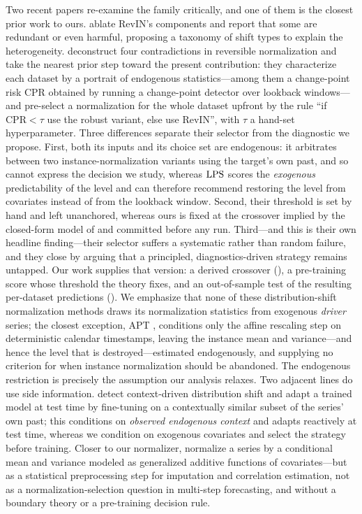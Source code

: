 Two recent papers re-examine the family critically, and one of them is the closest prior work to ours. \citet{role2026revin} ablate RevIN's components and report that some are redundant or even harmful, proposing a taxonomy of shift types to explain the heterogeneity. \citet{noise2025signal} deconstruct four contradictions in reversible normalization and take the nearest prior step toward the present contribution: they characterize each dataset by a portrait of endogenous statistics---among them a change-point risk $\mathrm{CPR}$ obtained by running a change-point detector over lookback windows---and pre-select a normalization for the whole dataset upfront by the rule ``if $\mathrm{CPR} < \tau$ use the robust variant, else use RevIN'', with $\tau$ a hand-set hyperparameter. Three differences separate their selector from the diagnostic we propose. First, both its inputs and its choice set are endogenous: it arbitrates between two instance-normalization variants using the target's own past, and so cannot express the decision we study, whereas $\mathrm{LPS}$ scores the \emph{exogenous} predictability of the level and can therefore recommend restoring the level from covariates instead of from the lookback window. Second, their threshold is set by hand and left unanchored, whereas ours is fixed at the crossover implied by the closed-form model of  and committed before any run. Third---and this is their own headline finding---their selector suffers a systematic rather than random failure, and they close by arguing that a principled, diagnostics-driven strategy remains untapped. Our work supplies that version: a derived crossover (), a pre-training score whose threshold the theory fixes, and an out-of-sample test of the resulting per-dataset predictions (). We emphasize that none of these distribution-shift normalization methods draws its normalization statistics from exogenous \emph{driver} series; the closest exception, APT \citep{li2026apt}, conditions only the affine rescaling step on deterministic calendar timestamps, leaving the instance mean and variance---and hence the level that is destroyed---estimated endogenously, and supplying no criterion for when instance normalization should be abandoned. The endogenous restriction is precisely the assumption our analysis relaxes. Two adjacent lines do use side information. \citet{chen2024solid} detect context-driven distribution shift and adapt a trained model at test time by fine-tuning on a contextually similar subset of the series' own past; this conditions on \emph{observed endogenous context} and adapts reactively at test time, whereas we condition on exogenous covariates and select the strategy before training. Closer to our normalizer, \citet{gamakumara2023conditional} normalize a series by a conditional mean and variance modeled as generalized additive functions of covariates---but as a statistical preprocessing step for imputation and correlation estimation, not as a normalization-selection question in multi-step forecasting, and without a boundary theory or a pre-training decision rule.

